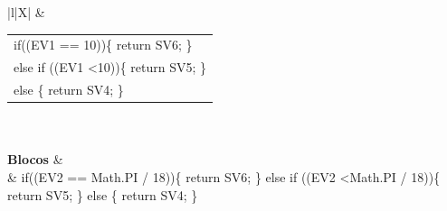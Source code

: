 \begin{xltabular}{\textwidth}{|l|X|}
{	} &  \begin{tabular}[c]{@{}l@{}}if((EV1 == 10))\{   return SV6; \}\\ else if ((EV1 \textless 10))\{ return SV5; \}\\ else \{   return SV4; \} \end{tabular}  \\ \hline
	 \\ \hline
	\textbf{Blocos} &  \\ \hline
	 & if((EV2 == Math.PI / 18))\{   return SV6; \} else if ((EV2 \textless Math.PI / 18))\{   return SV5; \} else \{   return SV4; \} \\ \hline


\end{xltabular}
